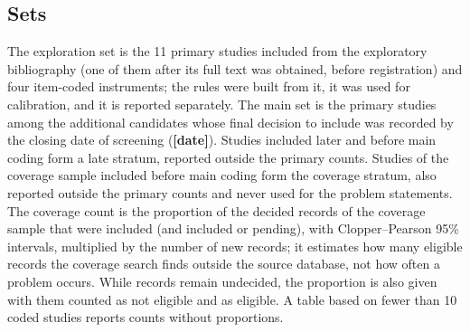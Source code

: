 \documentclass[11pt]{article}
\newcommand{\tbd}[1]{\textbf{[#1]}}
\begin{document}
\subsection{Sets}
The exploration set is the 11 primary studies included from the exploratory bibliography (one of them after its full
text was obtained, before registration) and four item-coded instruments; the rules were built from it, it was used for calibration, and it is reported separately. The main set is
the primary studies among the additional candidates whose final decision to include was recorded by the closing date
of screening (\tbd{date}). Studies included later and before main coding form a late stratum, reported outside the primary
counts. Studies of the coverage sample included before main coding form the coverage stratum, also reported outside
the primary counts and never used for the problem statements. The coverage count is the proportion of the decided
records of the coverage sample that were included (and included or pending), with Clopper--Pearson 95\% intervals,
multiplied by the number of new records; it estimates how many eligible records the coverage search finds outside
the source database, not how often a problem occurs. While records remain undecided, the proportion is also given
with them counted as not eligible and as eligible. A table based on fewer than 10 coded studies reports counts
without proportions.
\end{document}
